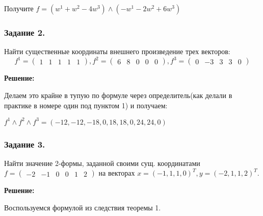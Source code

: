 Получите $f = (w^1 +w^2 - 4w^3)\wedge (-w^1-2w^2 + 6w^3)$

\subsubsection{Задание 2.}

Найти существенные координаты внешнего произведение трех векторов:
$$f^1=\begin{pmatrix}
    1 & 1&1&1&1
\end{pmatrix}, f^2 = \begin{pmatrix}
    6&8&0&0&0
\end{pmatrix},f^3 = \begin{pmatrix}
    0 & -3 & 3 & 3 & 0
\end{pmatrix}$$

\textbf{Решение:}

Делаем это крайне в тупую по формуле через определитель(как делали в практике в номере один под пунктом 1) и получаем:

$f^1 \wedge f^2 \wedge f^3 = (-12,-12,-18,0,18,18,0,24,24,0)$



\subsubsection{Задание 3.}

Найти значение 2-формы, заданной своими сущ. координатами
$f = \begin{pmatrix}
    -2 & -1 & 0 & 0 & 1 & 2
\end{pmatrix}$ на векторах $x= (-1,1,1,0)^T, y = (-2,1,1,2)^T$.

\textbf{Решение:}

Воспользуемся формулой из следствия теоремы 1.



